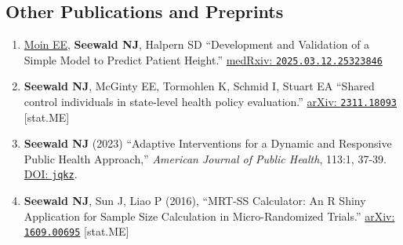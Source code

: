 \documentclass[letterpaper,11pt]{article} %
\begin{document}
\begin{enumerate}
			
			
 		
 	\end{enumerate}
	
	\subsection*{Other Publications and Preprints}
		\begin{enumerate}			
            \item \underline{Moin EE}, \textbf{Seewald NJ}, Halpern SD ``Development and Validation of a Simple Model to Predict Patient Height.'' \href{https://www.medrxiv.org/content/10.1101/2025.03.12.25323846}{medRxiv: \texttt{2025.03.12.25323846}}
            \item \textbf{Seewald NJ}, McGinty EE, Tormohlen K, Schmid I, Stuart EA ``Shared control individuals in state-level health policy evaluation.'' \href{https://arxiv.org/abs/2311.18093}{arXiv: \texttt{2311.18093}} [stat.ME]
			\item \textbf{Seewald NJ} (2023) ``Adaptive Interventions for a Dynamic and Responsive Public Health Approach,'' \textit{American Journal of Public Health}, 113:1, 37-39. \href{https://doi.org/jqkz}{DOI: \texttt{jqkz}}.
		    \item \textbf{Seewald NJ}, Sun J, Liao P (2016), ``MRT-SS Calculator: An R Shiny Application for Sample Size Calculation in Micro-Randomized Trials.'' \href{http://arxiv.org/abs/1609.00695}{arXiv: \texttt{1609.00695}} [stat.ME]
		\end{enumerate}
\end{document}
